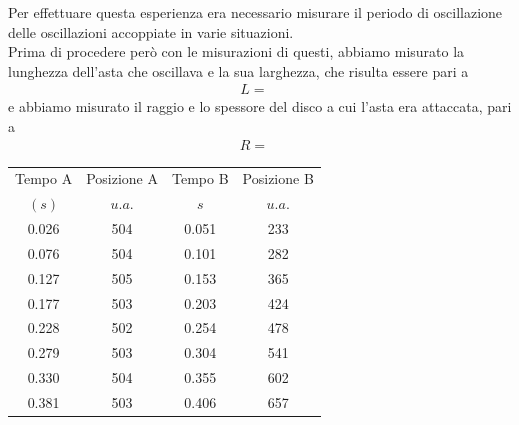 \documentclass{article}
\begin{document}
Per effettuare questa esperienza era necessario misurare il periodo di oscillazione delle oscillazioni accoppiate in varie situazioni. \\
Prima di procedere però con le misurazioni di questi, abbiamo misurato la lunghezza dell'asta che oscillava e la sua larghezza, che risulta essere pari a
\begin{align*}
    &L = & &
\end{align*}
e abbiamo misurato il raggio e lo spessore del disco a cui l'asta era attaccata, pari a
\begin{align*}
    &R = & & 
\end{align*}
\begin{minipage}{0.5\textwidth}
    \centering
    \begin{tabular}{c c c c}
        \toprule
        Tempo A & Posizione A & Tempo B & Posizione B \\
        $(s)$ &  $u.a.$ & $s$ & $u.a.$ \\ \toprule
        0.026 & 504 & 0.051 & 233 \\
        0.076 & 504 & 0.101 & 282 \\
        0.127 & 505 & 0.153 & 365 \\
        0.177 & 503 & 0.203 & 424 \\
        0.228 & 502 & 0.254 & 478 \\
        0.279 & 503 & 0.304 & 541 \\
        0.330 & 504 & 0.355 & 602 \\
        0.381 & 503 & 0.406 & 657 \\ \bottomrule
    \end{tabular}
    \captionsetup{format=plain}
\end{minipage}
\hspace{0.01\textwidth}
\end{document}
